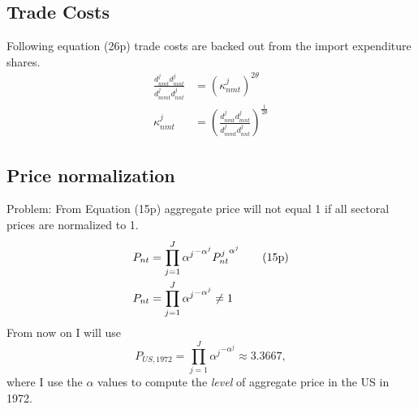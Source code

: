 \documentclass[11pt,oneside,a4paper]{article}
\begin{document}
\subsection{Trade Costs}
Following equation (26p) trade costs are backed out from the import expenditure shares.
\begin{align}
\frac{d_{nmt}^{j}d_{mnt}^{j}}{d_{mmt}^{j}d_{nnt}^{j}} &=\left( \kappa_{nmt}^{j}\right) ^{2\theta }  \tag{26p}\\
\kappa_{nmt}^{j} &= \left( \frac{d_{nmt}^{j}d_{mnt}^{j}}{d_{mmt}^{j}d_{nnt}^{j}}\right) ^{\frac{1}{2\theta}} 
\end{align}

\subsection{Price normalization}
Problem: From Equation (15p) aggregate price will not equal 1 if all sectoral prices are normalized to 1.
\begin{align}
P_{nt} &= \prod_{j = 1}^J {\alpha^j}^{- \alpha^j} {P_{nt}^j}^{\alpha^j} \tag{15p}\\
%
P_{nt} &= \prod_{j = 1}^J {\alpha^j}^{- \alpha^j} \neq 1 \notag
\end{align}
From now on I will use
\begin{equation}
P_{US, 1972} = \prod_{j = 1}^J {\alpha^j}^{- \alpha^j} \approx 3.3667,
\end{equation}
where I use the $\alpha$ values to compute the \emph{level} of aggregate price in the US in 1972.
\end{document}
